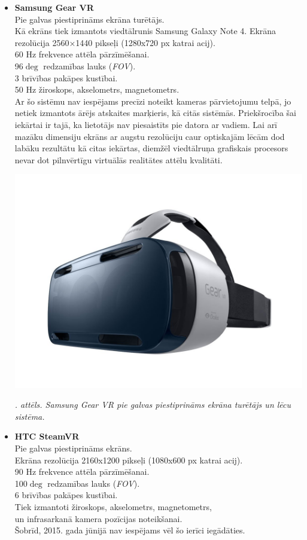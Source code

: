 \documentclass[12pt, a4paper, oneside, openright]{article}
\renewcommand{\thecimages}{\arabic{cimages}}
\begin{document}
\begin{itemize}
\item \textbf{Samsung Gear VR} \hfill \\
Pie galvas piestiprināms ekrāna turētājs.\\
Kā ekrāns tiek izmantots viedtālrunis Samsung Galaxy Note 4.
Ekrāna rezolūcija 2560×1440 pikseļi (1280x720 px katrai acij).\\
60 Hz frekvence attēla pārzīmēšanai.\\
96$\deg$ redzamības lauks (\textit{FOV}).\\
3 brīvības pakāpes kustībai.\\
50 Hz žiroskops, akselometrs, magnetometrs.\\

Ar šo sistēmu nav iespējams precīzi noteikt kameras pārvietojumu telpā, jo
netiek izmantots ārējs atskaites marķieris, kā citās sistēmās. Priekšrocība
šai iekārtai ir tajā, ka lietotājs nav piesaistīts pie datora ar vadiem.
Lai arī mazāku dimensiju ekrāns ar augstu rezolūciju caur optiskajām lēcām 
dod labāku rezultātu kā citas iekārtas, diemžēl viedtālruņa grafiskais
procesors nevar dot pilnvērtīgu virtuālās realitātes attēlu kvalitāti.

\label{cimages:samsung_vr.jpg}
\vspace{10pt}
\begin{samepage}
\begin{center}
\includegraphics[width=0.4\columnwidth]{images/samsung_vr.jpg}
\begin{center}
\footnotesize{
\textit{\thecimages. attēls. Samsung Gear VR pie galvas piestiprināms ekrāna turētājs un lēcu sistēma.}}
\end{center}
\end{center}
\end{samepage}

\item \textbf{HTC SteamVR} \hfill \\
Pie galvas piestiprināms ekrāns.\\
Ekrāna rezolūcija 2160x1200 pikseļi (1080x600 px katrai acij).\\
90 Hz frekvence attēla pārzīmēšanai.\\
100$\deg$ redzamības lauks (\textit{FOV}).\\
6 brīvības pakāpes kustībai.\\
Tiek izmantoti žiroskops, akselometrs, magnetometrs, \\
un infrasarkanā kamera pozīcijas noteikšanai. \\
Šobrīd, 2015. gada jūnijā nav iespējams vēl šo ierīci iegādāties.


\end{itemize}
\end{document}
